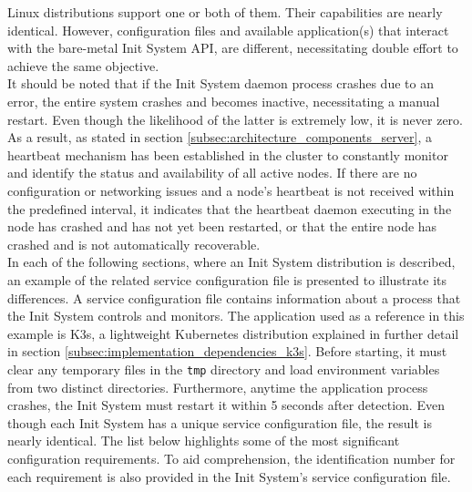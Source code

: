 Linux distributions support one or both of them. Their capabilities are nearly identical.
However, configuration files and available application(s) that interact with the
bare-metal Init System API, are different, necessitating double effort to
achieve the same objective. \\ %
It should be noted that if the Init System daemon process crashes due to an
error, the entire system crashes and becomes inactive, necessitating a manual
restart. Even though the likelihood of the latter is extremely low, it is never
zero. As a result, as stated in section
\ref{subsec:architecture_components_server}, a heartbeat mechanism has been established
in the cluster to constantly monitor and identify the status and availability of
all active nodes. If there are no configuration or networking issues and a node's
heartbeat is not received within the predefined interval, it indicates that the heartbeat
daemon executing in the node has crashed and has not yet been restarted, or that
the entire node has crashed and is not automatically recoverable. \\ %
In each of the following sections, where an Init System distribution is described,
an example of the related service configuration file is presented to illustrate
its differences. A service configuration file contains information about a process
that the Init System controls and monitors. The application used as a reference
in this example is K3s, a lightweight Kubernetes distribution explained in further
detail in section \ref{subsec:implementation_dependencies_k3s}. Before starting,
it must clear any temporary files in the \texttt{tmp} directory and load
environment variables from two distinct directories. Furthermore, anytime the
application process crashes, the Init System must restart it within 5 seconds after
detection. Even though each Init System has a unique service configuration file,
the result is nearly identical. The list below highlights some of the most
significant configuration requirements. To aid comprehension, the identification
number for each requirement is also provided in the Init System's service
configuration file.
